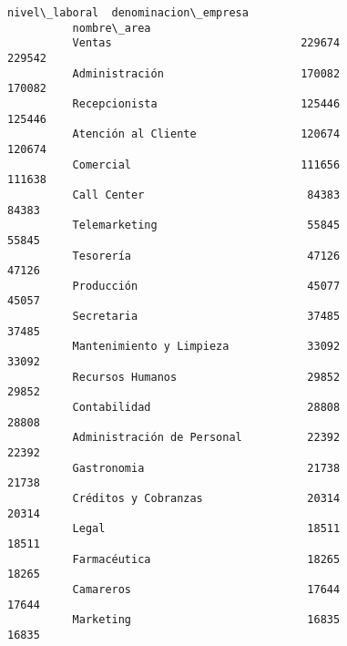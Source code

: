 \documentclass[11pt]{article}
\begin{document}
\begin{Verbatim}[commandchars=\\\{\}]
                                      nivel\_laboral  denominacion\_empresa  
          nombre\_area                                                      
          Ventas                             229674                229542  
          Administración                     170082                170082  
          Recepcionista                      125446                125446  
          Atención al Cliente                120674                120674  
          Comercial                          111656                111638  
          Call Center                         84383                 84383  
          Telemarketing                       55845                 55845  
          Tesorería                           47126                 47126  
          Producción                          45077                 45057  
          Secretaria                          37485                 37485  
          Mantenimiento y Limpieza            33092                 33092  
          Recursos Humanos                    29852                 29852  
          Contabilidad                        28808                 28808  
          Administración de Personal          22392                 22392  
          Gastronomia                         21738                 21738  
          Créditos y Cobranzas                20314                 20314  
          Legal                               18511                 18511  
          Farmacéutica                        18265                 18265  
          Camareros                           17644                 17644  
          Marketing                           16835                 16835  
\end{Verbatim}
            
\end{document}
